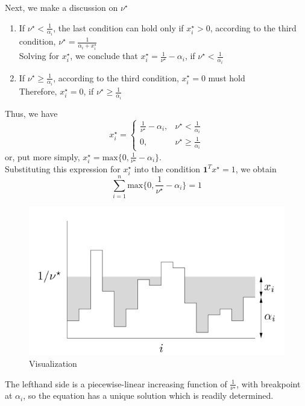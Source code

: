 \documentclass[12pt, a4paper, oneside]{article}
\begin{document}
Next, we make a discussion on $\nu^{\star}$
\begin{enumerate}
    \item 
    {
        If $\nu^{\star} < \frac{1}{\alpha_i}$, the last condition can hold only if $x_i^{\star} > 0$, 
        according to the third condition, $\nu^{\star} = \frac{1}{\alpha_i + x_i^{\star}}$\\
        Solving for $x_i^{\star}$, we conclude that $x_i^{\star} = \frac{1}{\nu^{\star}} - \alpha_i$, if $\nu^{\star} < \frac{1}{\alpha_i}$
    }
    \item 
    {
        If $\nu^{\star} \geqslant \frac{1}{\alpha_i}$, according to the third condition, $x_i^{\star} = 0$ must hold\\
        Therefore, $x_i^{\star} = 0$, if $\nu^{\star} \geqslant \frac{1}{\alpha_i}$
    }
\end{enumerate}
Thus, we have
\begin{displaymath}
    x_i^{\star} = \left\{ 
    \begin{array}{lcr}
            \frac{1}{\nu^{\star}} - \alpha_i ,  &  \nu^{\star} < \frac{1}{\alpha_i}\\
            0 , & \nu^{\star} \geqslant \frac{1}{\alpha_i}
    \end{array}
    \right.
\end{displaymath}
or, put more simply, $x_i^{\star} = \mbox{max}\{0, \frac{1}{\nu^{\star}} - \alpha_i\}$.\\
Substituting this expression for $x_i^{\star}$ into the condition $\mathbf{1}^Tx^{\star} = 1$, we obtain
\begin{displaymath}
    \sum_{i = 1}^{n}\mbox{max}\{0, \frac{1}{\nu^{\star}} - \alpha_i\} = 1
\end{displaymath}
\begin{figure}[H]
    \centering
    \includegraphics[width = 12cm]{illustration.png}
    \caption{Visualization}
\end{figure}
The lefthand side is a piecewise-linear increasing function of $\frac{1}{\nu^{\star}}$, with breakpoint at $\alpha_i$, so the equation has a unique solution which is readily determined.
\end{document}
